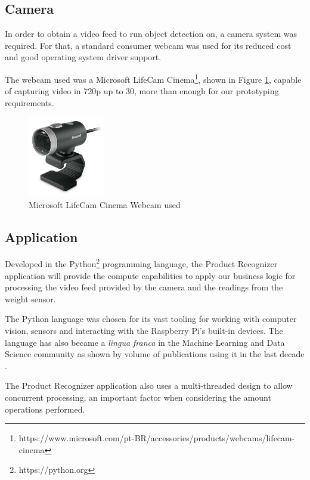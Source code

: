 \documentclass[openright]{normas-utf-tex} %
\begin{document}
\subsection{Camera}

In order to obtain a video feed to run object detection on, a camera system was
required. For that, a standard consumer webcam was used for its reduced cost
and good operating system driver support.

The webcam used was a Microsoft LifeCam
Cinema\footnote{https://www.microsoft.com/pt-BR/accessories/products/webcams/lifecam-cinema},
 shown in Figure \ref{fig:camera}, capable of capturing video in 720p up to 30, more
than enough for our prototyping requirements.

\begin{figure}[H]
	\centering
	\includegraphics[width=0.3\textwidth]{./images/webcam.jpg}
    \caption[Microsoft LifeCam Cinema Webcam used]{Microsoft LifeCam Cinema Webcam used}
    \label{fig:camera}
\end{figure}

\subsection{Application}

Developed in the Python\footnote{https://python.org} programming language, the
Product Recognizer application will provide the compute capabilities to apply
our business logic for processing the video feed provided by the camera and the
readings from the weight sensor.

The Python language was chosen for its vast tooling for working with computer
vision, sensors and interacting with the Raspberry Pi's built-in devices. The
language has also became a \textit{lingua franca} in the Machine Learning and
Data Science community as shown by volume of publications using it in the last
decade \cite{Wes2017,Joel2019,Andreas2016}.

The Product Recognizer application also uses a multi-threaded design to allow
concurrent processing, an important factor when considering the amount
 operations performed.
\end{document}
